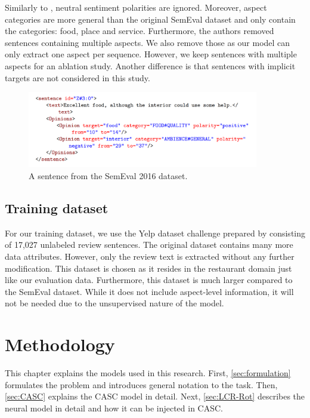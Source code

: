 \documentclass[american, oneside]{ecsgdp}
\begin{document}
Similarly to \textcite{Huang2020JASen, Kumar2021CASC}, neutral sentiment polarities are ignored. Moreover, aspect categories are more general than the original SemEval dataset and only contain the categories: food, place and service. Furthermore, the authors removed sentences containing multiple aspects. We also remove those as our model can only extract one aspect per sequence. However, we keep sentences with multiple aspects for an ablation study. Another difference is that sentences with implicit targets are not considered in this study.

\begin{figure}[htbp]
    \centering
    \includegraphics[width=0.9\textwidth]{example_semeval.PNG}
    \caption{A sentence from the SemEval 2016 dataset.}
    \label{fig:example_semeval}
\end{figure}

\section{Training dataset} \label{sec:training_data}
For our training dataset, we use the Yelp dataset challenge prepared by \textcite{Huang2020JASen} consisting of 17,027 unlabeled review sentences. The original dataset \parencite{Tang2016Yelp} contains many more data attributes. However, only the review text is extracted without any further modification. This dataset is chosen as it resides in the restaurant domain just like our evaluation data. Furthermore, this dataset is much larger compared to the SemEval dataset. While it does not include aspect-level information, it will not be needed due to the unsupervised nature of the model.

\chapter{Methodology} \label{chap:methodology}

This chapter explains the models used in this research. First, \cref{sec:formulation} formulates the problem and introduces general notation to the task. Then, \cref{sec:CASC} explains the CASC model in detail. Next, \cref{sec:LCR-Rot} describes the neural model in detail and how it can be injected in CASC.
\end{document}
